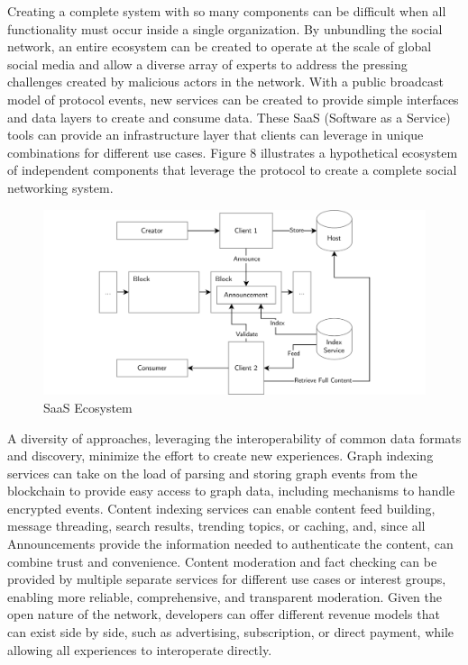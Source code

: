 \documentclass[12pt,letterpaper]{article}
\begin{document}
Creating a complete system with so many components can be difficult when all functionality
must occur inside a single organization. By unbundling the social network, an entire
ecosystem can be created to operate at the scale of global social media and allow a
diverse array of experts to address the pressing challenges created by malicious actors in
the network. With a public broadcast model of protocol events, new services can be created
to provide simple interfaces and data layers to create and consume data. These SaaS
(Software as a Service) tools can provide an infrastructure layer that clients can
leverage in unique combinations for different use cases. Figure 8 illustrates a
hypothetical ecosystem of independent components that leverage the protocol to create a
complete social networking system.

\begin{figure}
	\includegraphics[width=\linewidth]{figures/SaaS Ecosystem.png}
	\caption{SaaS Ecosystem}
	\label{fig:8}
\end{figure}

A diversity of approaches, leveraging the interoperability of common data formats and
discovery, minimize the effort to create new experiences. Graph indexing services can take
on the load of parsing and storing graph events from the blockchain to provide easy access
to graph data, including mechanisms to handle encrypted events. Content indexing services
can enable content feed building, message threading, search results, trending topics, or
caching, and, since all Announcements provide the information needed to authenticate the
content, can combine trust and convenience. Content moderation and fact checking can be
provided by multiple separate services for different use cases or interest groups,
enabling more reliable, comprehensive, and transparent moderation. Given the open nature
of the network, developers can offer different revenue models that can exist side by side,
such as advertising, subscription, or direct payment, while allowing all experiences to
interoperate directly.
\end{document}
